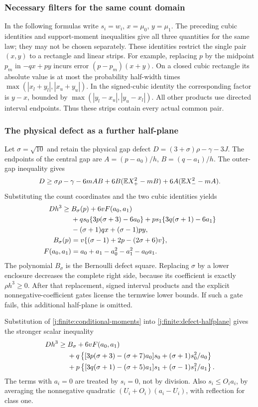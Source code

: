 \subsubsection{Necessary filters for the same count domain}\label{j:finite:filters}
In the following formulas write $s_i=w_i$, $x=\mu_0$, $y=\mu_1$.
The preceding cubic identities and support-moment inequalities give all
three quantities for the same law; they may not be chosen separately.
These identities restrict the single pair $(x,y)$ to a rectangle and
linear strips. For example, replacing $p$ by the midpoint $p_m$ in
$-qx+py$ incurs error $(p-p_m)(x+y)$. On a closed cubic rectangle
its absolute value is at most the probability half-width times
$\max(|x_l+y_l|,|x_u+y_u|)$. In the signed-cubic identity the
corresponding factor is $y-x$, bounded by
$\max(|y_l-x_u|,|y_u-x_l|)$. All other products use directed interval
endpoints. Thus these strips contain every actual common pair.

\subsubsection{The physical defect as a further half-plane}
Let $\sigma=\sqrt{10}$ and retain the physical gap defect
$D=(3+\sigma)\rho-\gamma-3J$.
The endpoints of the central gap are
$A=(p-a_0)/h$, $B=(q-a_1)/h$.
The outer-gap inequality gives
\[
 D\ge\sigma\rho-\gamma-6mAB
       +6B(\mathbb E X_+^2-mB)+6A(\mathbb E X_-^2-mA).
\]
Substituting the count coordinates and the two cubic identities yields
\begin{align}
 Dh^3\ge{}&B_\sigma(p)+6vF(a_0,a_1)\notag\\
 &+qs_0\{3p(\sigma+3)-6a_0\}
  +ps_1\{3q(\sigma+1)-6a_1\}\notag\\
 &-(\sigma+1)qx+(\sigma-1)py,\label{j:finite:defect-halfplane}\\
 B_\sigma(p)&=v\{(\sigma-1)+2p-(2\sigma+6)v\},\notag\\
 F(a_0,a_1)&=a_0+a_1-a_0^2-a_1^2-a_0a_1.\notag
\end{align}
The polynomial $B_\sigma$ is the Bernoulli defect square.
Replacing $\sigma$ by a lower enclosure decreases the complete right
side, because its coefficient is exactly $\rho h^3\ge0$.
After that replacement, signed interval products and the explicit
nonnegative-coefficient gates license the termwise lower bounds.
If such a gate fails, this additional half-plane is omitted.

Substitution of \eqref{j:finite:conditional-moments} into
\eqref{j:finite:defect-halfplane} gives the stronger scalar inequality
\begin{align}
 Dh^3\ge{}&B_\sigma+6vF(a_0,a_1)\notag\\
 &+q\left\{[3p(\sigma+3)-(\sigma+7)a_0]s_0
                         +(\sigma+1)s_0^2/a_0\right\}\notag\\
 &+p\left\{[3q(\sigma+1)-(\sigma+5)a_1]s_1
                         +(\sigma-1)s_1^2/a_1\right\}.
 \label{j:finite:defect-sharp}
\end{align}
The terms with $a_i=0$ are treated by $s_i=0$, not by division.
Also $s_i\le O_i a_i$, by averaging the nonnegative quadratic
$(U_i+O_i)(a_i-U_i)$, with reflection for class one.

